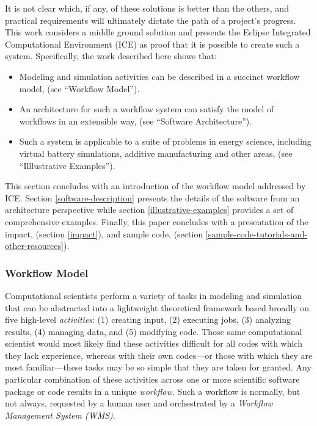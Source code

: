 It is not clear which, if any, of these solutions is better than the
others, and practical requirements will ultimately dictate the path of a
project's progress. This work considers a middle ground solution and
presents the Eclipse Integrated Computational Environment (ICE) as proof
that it is possible to create such a system. Specifically, the work
described here shows that:

\begin{itemize}
\item
  Modeling and simulation activities can be described in a succinct
  workflow model, (see ``Workflow Model'').
\item
  An architecture for such a workflow system can satisfy the model of
  workflows in an extensible way, (see ``Software Architecture'').
\item
  Such a system is applicable to a suite of problems in energy science,
  including virtual battery simulations, additive manufacturing and
  other areas, (see ``Illlustrative Examples'').
\end{itemize}

This section concludes with an introduction of the workflow model addressed by
ICE. Section \ref{software-description} presents the details of the software
from an architecture perspective while section \ref{illustrative-examples}
provides a set of comprehensive examples. Finally, this paper concludes with a
presentation of the impact, (section \ref{impact}), and sample code,
(section \ref{sample-code-tutorials-and-other-resources}).

\subsubsection{Workflow Model}\label{workflow-model}

Computational scientists perform a variety of tasks in modeling and
simulation that can be abstracted into a lightweight theoretical
framework based broadly on five high-level \emph{activities}: (1)
creating input, (2) executing jobs, (3) analyzing results, (4) managing
data, and (5) modifying code. Those same computational scientist would
most likely find these activities difficult for all codes with which
they lack experience, whereas with their own codes---or those with which
they are most familiar---these tasks may be so simple that they are
taken for granted. Any particular combination of these activities across
one or more scientific software package or code results in a unique
\emph{workflow}. Such a workflow is normally, but not always, requested
by a human user and orchestrated by a \emph{Workflow Management System
(WMS)}.

